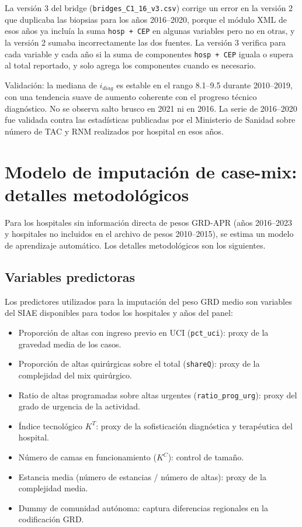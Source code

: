 La versión 3 del bridge (\texttt{bridges\_C1\_16\_v3.csv}) corrige un error en la versión 2 que duplicaba las biopsias para los años 2016--2020, porque el módulo XML de esos años ya incluía la suma \texttt{hosp + CEP} en algunas variables pero no en otras, y la versión 2 sumaba incorrectamente las dos fuentes. La versión 3 verifica para cada variable y cada año si la suma de componentes \texttt{hosp + CEP} iguala o supera al total reportado, y solo agrega los componentes cuando es necesario.

Validación: la mediana de $i_{diag}$ es estable en el rango 8.1--9.5 durante 2010--2019, con una tendencia suave de aumento coherente con el progreso técnico diagnóstico. No se observa salto brusco en 2021 ni en 2016. La serie de 2016--2020 fue validada contra las estadísticas publicadas por el Ministerio de Sanidad sobre número de TAC y RNM realizados por hospital en esos años.

\section{Modelo de imputación de case-mix: detalles metodológicos}
\label{sec:casemix_imputacion}

Para los hospitales sin información directa de pesos GRD-APR (años 2016--2023 y hospitales no incluidos en el archivo de pesos 2010--2015), se estima un modelo de aprendizaje automático. Los detalles metodológicos son los siguientes.

\subsection{Variables predictoras}

Los predictores utilizados para la imputación del peso GRD medio son variables del SIAE disponibles para todos los hospitales y años del panel:

\begin{itemize}
  \item Proporción de altas con ingreso previo en UCI (\texttt{pct\_uci}): proxy de la gravedad media de los casos.
  \item Proporción de altas quirúrgicas sobre el total (\texttt{shareQ}): proxy de la complejidad del mix quirúrgico.
  \item Ratio de altas programadas sobre altas urgentes (\texttt{ratio\_prog\_urg}): proxy del grado de urgencia de la actividad.
  \item Índice tecnológico $K^T$: proxy de la sofisticación diagnóstica y terapéutica del hospital.
  \item Número de camas en funcionamiento ($K^C$): control de tamaño.
  \item Estancia media (número de estancias / número de altas): proxy de la complejidad media.
  \item Dummy de comunidad autónoma: captura diferencias regionales en la codificación GRD.
\end{itemize}

